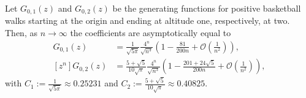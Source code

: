 \begin{theorem}
  Let $G_{0,1}(z)$ and $G_{0,2}(z)$ be the generating functions for positive basketball walks starting at the origin and ending at altitude one, respectively, at two. Then, as $n \to \infty$ the coefficients are asymptotically equal to
  \begin{align*}
    [z^{n}]G_{0,1}(z) &= \frac{1}{\sqrt{5\pi}} \frac{4^{n}}{\sqrt{n^3}}
    \left(
      1 - \frac{81}{200n}+ \mathcal{O}
      \left(\frac{1}{n^{2}}\right)
    \right), \\
    [z^{n}]G_{0,2}(z) &= \frac{5+\sqrt{5}}{10\sqrt{\pi}} \frac{4^{n}}{\sqrt{n^3}}
    \left(
      1 - \frac{201+24\sqrt{5}}{200n} + 
      \mathcal{O}\left(\frac{1}{n^{2}}\right)
    \right),
  \end{align*}
  with $C_1 := \frac{1}{\sqrt{5\pi}} \approx 0.25231$ and
  $C_2 := \frac{5+\sqrt{5}}{10\sqrt{\pi}} \approx 0.40825$.
\end{theorem}

